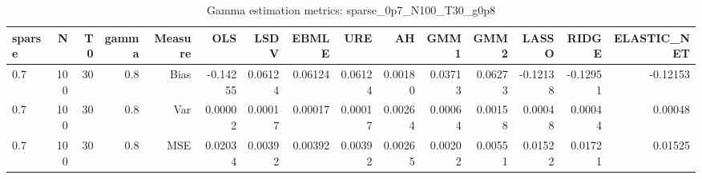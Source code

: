 \begin{table}[!htbp]\centering
\caption{Gamma estimation metrics: sparse_0p7_N100_T30_g0p8}
\label{tab:table1_sparse_0p7_N100_T30_g0p8}
\begin{tabular}{lrrrrrrrrrrrrrr}
\hline
sparse & N & T0 & gamma & Measure & OLS & LSDV & EBMLE & URE & AH & GMM1 & GMM2 & LASSO & RIDGE & ELASTIC_NET \\
\hline
0.7 & 100 & 30 & 0.8 & Bias & -0.14255 & 0.06124 & 0.06124 & 0.06124 & 0.00180 & 0.03713 & 0.06273 & -0.12138 & -0.12951 & -0.12153 \\
0.7 & 100 & 30 & 0.8 & Var & 0.00002 & 0.00017 & 0.00017 & 0.00017 & 0.00264 & 0.00064 & 0.00158 & 0.00048 & 0.00044 & 0.00048 \\
0.7 & 100 & 30 & 0.8 & MSE & 0.02034 & 0.00392 & 0.00392 & 0.00392 & 0.00265 & 0.00202 & 0.00551 & 0.01522 & 0.01721 & 0.01525 \\
\hline
\end{tabular}
\end{table}

